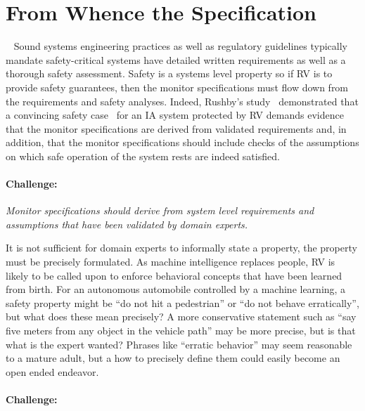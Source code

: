\section{From Whence the Specification}~\label{sec:req}
Sound systems engineering practices  as well
as regulatory guidelines typically mandate safety-critical systems
have detailed written requirements as well as a thorough safety
assessment. Safety is a systems level property so if RV is  to  provide safety guarantees,
then the  monitor specifications must flow down from the requirements
and safety analyses.   Indeed, Rushby's study~\cite{rvRushby,RushbyAIAA09} demonstrated
that  a convincing safety case~\cite{Kelly98arguingsafety} for an IA
system protected by RV  demands evidence that the
monitor specifications are  derived from validated requirements and, in
addition, that the monitor specifications should include checks of the assumptions on
which safe operation of the system rests  are indeed satisfied.



\paragraph{Challenge:}   \emph{ Monitor specifications should derive from
  system level requirements and assumptions that have been validated
  by domain experts.} 

It is not sufficient for   domain experts to informally state a
property, the property must be precisely formulated.  As machine
intelligence replaces people,  RV is likely to be called upon to
enforce behavioral concepts that have been learned from birth.     For an  autonomous
automobile controlled by a machine learning, a safety property might
be ``do not hit a pedestrian'' or ``do  not behave erratically'', but
what does these mean precisely?  A more conservative statement such as
``say five meters from any object in the vehicle path'' may be more
precise, but is that what is the expert wanted?   Phrases like
``erratic behavior'' may seem reasonable to a mature adult, but a how
to precisely define them could easily become an open ended endeavor. 

\paragraph{Challenge:} 

